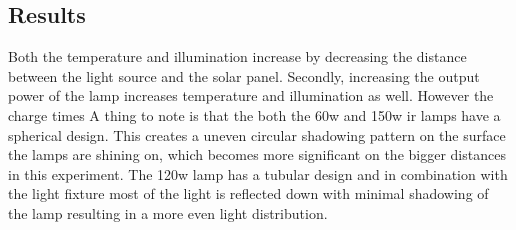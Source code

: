 \subsection{Results}

Both the temperature and illumination increase by decreasing the distance between the light source and the solar panel. 
Secondly, increasing the output power of the lamp increases temperature and illumination as well. 
However the charge times 
A thing to note is that the both the 60w and 150w ir lamps have a spherical design. This creates a uneven circular shadowing pattern on the surface the lamps are shining on, which becomes more significant on the bigger distances in this experiment.
The 120w lamp has a tubular design and in combination with the light fixture most of the light is reflected down with minimal shadowing of the lamp resulting in a more even light distribution.

